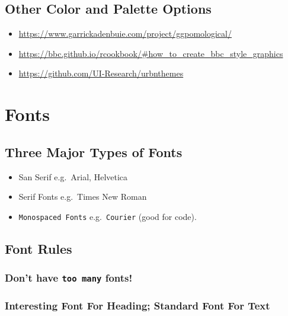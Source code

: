 \documentclass[]{article}
\providecommand{\tightlist}{%
  \setlength{\itemsep}{0pt}\setlength{\parskip}{0pt}}
\begin{document}
\hypertarget{other-color-and-palette-options}{%
\subsection{Other Color and Palette
Options}\label{other-color-and-palette-options}}

\begin{itemize}
\tightlist
\item
  \url{https://www.garrickadenbuie.com/project/ggpomological/}
\item
  \url{https://bbc.github.io/rcookbook/\#how_to_create_bbc_style_graphics}
\item
  \url{https://github.com/UI-Research/urbnthemes}
\end{itemize}

\hypertarget{fonts}{%
\section{Fonts}\label{fonts}}

\hypertarget{three-major-types-of-fonts}{%
\subsection{Three Major Types of
Fonts}\label{three-major-types-of-fonts}}

\begin{itemize}
\tightlist
\item
  San Serif e.g.~Arial, Helvetica
\item
  Serif Fonts e.g.~Times New Roman
\item
  \texttt{Monospaced\ Fonts} e.g.~\texttt{Courier} (good for code).
\end{itemize}

\hypertarget{font-rules}{%
\subsection{Font Rules}\label{font-rules}}

\hypertarget{dont-have-too-many-fonts}{%
\subsubsection{\texorpdfstring{Don't have \texttt{too\ many}
fonts!}{Don't have too many fonts!}}\label{dont-have-too-many-fonts}}

\hypertarget{interesting-font-for-heading-standard-font-for-text}{%
\subsubsection{Interesting Font For Heading; Standard Font For
Text}\label{interesting-font-for-heading-standard-font-for-text}}
\end{document}
